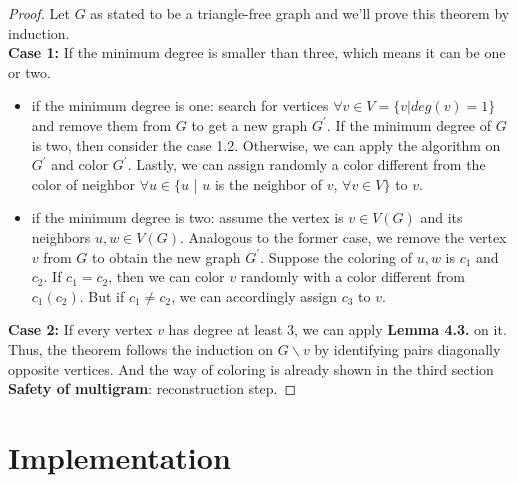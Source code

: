 \begin{proof}
Let $G$ as stated to be a triangle-free graph and we'll prove this theorem by induction.\\
\textbf{Case 1: } If the minimum degree is smaller than three, which means it can be one or two.
\begin{itemize}
    \item if the minimum degree is one: search for vertices $\forall v \in V = \{v | deg(v) = 1\}$ and remove them from $G$ to get a new graph $G^{'}$. If the minimum degree of $G$ is two, then consider the case 1.2. Otherwise, we can apply the algorithm on $G^{'}$ and color $G^{'}$. Lastly, we can assign randomly a color different from the color of neighbor $\forall u \in \{u$ | $u$ is the neighbor of $v$, $\forall v \in V \}$ to $v$. 
    
    \item if the minimum degree is two: assume the vertex is $v \in V(G)$ and its neighbors $u, w \in V(G)$. Analogous to the former case, we remove the vertex $v$ from $G$ to obtain the new graph $G^{'}$. Suppose the coloring of $u, w$ is $c_1$ and $c_2$. If $c_1 = c_2$, then we can color $v$ randomly with a color different from $c_1(c_2)$. But if $c_1 \ne c_2$, we can accordingly assign $c_3$ to $v$. 
\end{itemize}
\textbf{Case 2:}  If every vertex $v$ has degree at least 3, we can apply \textbf{Lemma 4.3.} on it. Thus, the theorem follows the induction on $G \backslash v$ by identifying pairs diagonally opposite vertices. And the way of coloring is already shown in the third section \textbf{Safety of multigram}: reconstruction step. 

\end{proof}
\section{Implementation}
